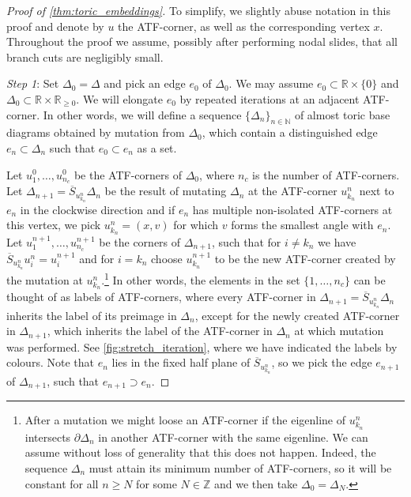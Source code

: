 \documentclass[12pt,a4paper,abstract=true,draft]{scrartcl}
\begin{document}
\begin{proof}[Proof of \cref{thm:toric_embeddings}]
To simplify, we slightly abuse notation in this proof and denote by $u$ the ATF-corner, as well as the corresponding vertex $x$. Throughout the proof we assume, possibly after performing nodal slides, that all branch cuts are negligibly small.

\medskip

\emph{Step 1}:
Set $Δ_0 = Δ$ and pick an edge $e_0$ of $Δ_0$.
We may assume $e_0 ⊂ ℝ × \{0\}$ and $Δ_0 ⊂ ℝ × ℝ_{ ≥0}$.
We will elongate $e_0$ by repeated iterations at an adjacent ATF-corner.
In other words, we will define a sequence $\{\Delta_n\}_{n \in  \mathbb{N}}$ of almost toric base diagrams obtained by mutation from $\Delta_0$, which contain a distinguished edge $e_n \subset \Delta_n$ such that $e_0 \subset e_n$ as a set.

Let $u_1^0,…,u_{n_c}^0$ be the ATF-corners of $Δ_0$, where $n_c$ is the number of ATF-corners.
Let $Δ_{n+1} = \overline{S}_{u_{k_n}^n} Δ_n$ be the result of mutating $Δ_n$ at the ATF-corner $u_{k_n}^n$ next to $e_n$ in the clockwise direction and if $e_n$ has multiple non-isolated ATF-corners at this vertex, we pick $u_{k_n}^n = (x,v)$ for which $v$ forms the smallest angle with $e_n$.
Let $u_1^{n+1},…,u_{n_c}^{n+1}$ be the corners of $Δ_{n+1}$, such that for $i ≠ k_n$ we have $\overline{S}_{u_{k_n}^n} u_i^n = u_i^{n+1}$ and for $i=k_n$ choose $u_{k_n}^{n+1}$ to be the new ATF-corner created by the mutation at $u_{k_n}^n$.\footnote{After a mutation we might loose an ATF-corner if the eigenline of $u_{k_n}^n$ intersects $∂Δ_n$ in another ATF-corner with the same eigenline.
We can assume without loss of generality that this does not happen. Indeed, the sequence $Δ_n$ must attain its minimum number of ATF-corners, so it will be constant for all $n ≥N$ for some $N ∈ ℤ$ and we then take $Δ_0=Δ_N$.} In other words, the elements in the set $\{1,\ldots,n_c\}$ can be thought of as labels of ATF-corners, where every ATF-corner in $Δ_{n+1} = \overline{S}_{u_{k_n}^n} Δ_n$ inherits the label of its preimage in $\Delta_n$, except for the newly created ATF-corner in $\Delta_{n+1}$, which inherits the label of the ATF-corner in $\Delta_n$ at which mutation was performed.
See \cref{fig:stretch_iteration}, where we have indicated the labels by colours.
Note that $e_n$ lies in the fixed half plane of $\overline{S}_{u_{k_n}^n}$, so we pick the edge $e_{n+1}$ of $Δ_{n+1}$, such that $e_{n+1} ⊃ e_n$.


\end{proof}
\end{document}
